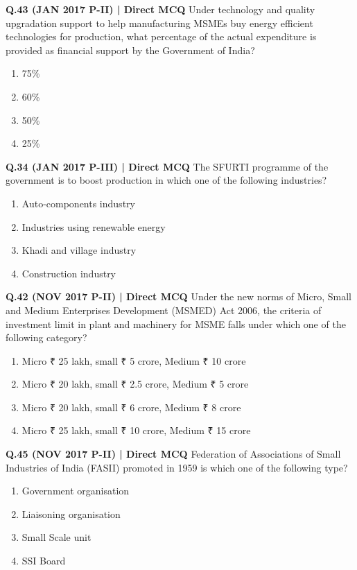 \documentclass{article}
\begin{document}
\textbf{Q.43 (JAN 2017 P-II) | Direct MCQ}
Under technology and quality upgradation support to help manufacturing MSMEs buy energy efficient technologies for production, what percentage of the actual expenditure is provided as financial support by the Government of India?
\begin{enumerate}[label=(\arabic*)]
    \item 75\%
    \item 60\%
    \item 50\%
    \item 25\%
\end{enumerate}

\textbf{Q.34 (JAN 2017 P-III) | Direct MCQ}
The SFURTI programme of the government is to boost production in which one of the following industries?
\begin{enumerate}[label=(\arabic*)]
    \item Auto-components industry
    \item Industries using renewable energy
    \item Khadi and village industry
    \item Construction industry
\end{enumerate}

\textbf{Q.42 (NOV 2017 P-II) | Direct MCQ}
Under the new norms of Micro, Small and Medium Enterprises Development (MSMED) Act 2006, the criteria of investment limit in plant and machinery for MSME falls under which one of the following category?
\begin{enumerate}[label=(\arabic*)]
    \item Micro ₹ 25 lakh, small ₹ 5 crore, Medium ₹ 10 crore
    \item Micro ₹ 20 lakh, small ₹ 2.5 crore, Medium ₹ 5 crore
    \item Micro ₹ 20 lakh, small ₹ 6 crore, Medium ₹ 8 crore
    \item Micro ₹ 25 lakh, small ₹ 10 crore, Medium ₹ 15 crore
\end{enumerate}

\textbf{Q.45 (NOV 2017 P-II) | Direct MCQ}
Federation of Associations of Small Industries of India (FASII) promoted in 1959 is which one of the following type?
\begin{enumerate}[label=(\arabic*)]
    \item Government organisation
    \item Liaisoning organisation
    \item Small Scale unit
    \item SSI Board
\end{enumerate}
\end{document}

